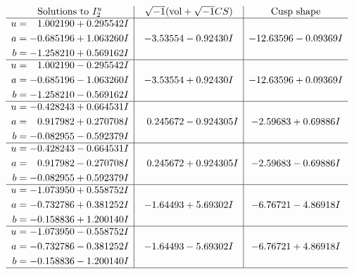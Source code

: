 \documentclass[1p]{elsarticle_modified}
\theoremstyle{definition}
\newcommand{\I}{\sqrt{-1}}
\begin{document}
$$\begin{array}{c|c|c}  
\text{Solutions to }I^u_{2}& \I (\text{vol} + \sqrt{-1}CS) & \text{Cusp shape}\\
 \hline 
\begin{aligned}
u &= \phantom{-}1.002190 + 0.295542 I \\
a &= -0.685196 + 1.063260 I \\
b &= -1.258210 + 0.569162 I\end{aligned}
 & -3.53554 - 0.92430 I & -12.63596 - 0.09369 I \\ \hline\begin{aligned}
u &= \phantom{-}1.002190 - 0.295542 I \\
a &= -0.685196 - 1.063260 I \\
b &= -1.258210 - 0.569162 I\end{aligned}
 & -3.53554 + 0.92430 I & -12.63596 + 0.09369 I \\ \hline\begin{aligned}
u &= -0.428243 + 0.664531 I \\
a &= \phantom{-}0.917982 + 0.270708 I \\
b &= -0.082955 - 0.592379 I\end{aligned}
 & \phantom{-}0.245672 - 0.924305 I & -2.59683 + 0.69886 I \\ \hline\begin{aligned}
u &= -0.428243 - 0.664531 I \\
a &= \phantom{-}0.917982 - 0.270708 I \\
b &= -0.082955 + 0.592379 I\end{aligned}
 & \phantom{-}0.245672 + 0.924305 I & -2.59683 - 0.69886 I \\ \hline\begin{aligned}
u &= -1.073950 + 0.558752 I \\
a &= -0.732786 + 0.381252 I \\
b &= -0.158836 + 1.200140 I\end{aligned}
 & -1.64493 + 5.69302 I & -6.76721 - 4.86918 I \\ \hline\begin{aligned}
u &= -1.073950 - 0.558752 I \\
a &= -0.732786 - 0.381252 I \\
b &= -0.158836 - 1.200140 I\end{aligned}
 & -1.64493 - 5.69302 I & -6.76721 + 4.86918 I\\
 \hline 
 \end{array}$$\newpage
\newpage\renewcommand{\arraystretch}{1}
\end{document}

